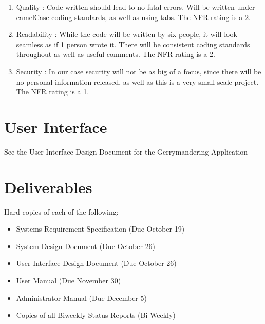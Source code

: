 \documentclass{article}
\begin{document}
\begin{addmargin}[2em]{0em}
\begin{enumerate}
\item Quality : Code written should lead to no fatal errors. Will be written under camelCase coding standards, as well as using tabs. The NFR rating is a 2.

\item Readability : While the code will be written by six people, it will look seamless as if 1 person wrote it. There will be consistent coding standards throughout as well as useful comments. The NFR rating is a 2.

\item Security : In our case security will not be as big of a focus, since there will be no personal information released, as well as this is a very small scale project. The NFR rating is a 1.

\end{enumerate}
\end{addmargin}


\section{User Interface}\label{sec:ui}
\vspace{2.5mm}

See the User Interface Design Document for the Gerrymandering Application

\vspace{2.5mm}
\section{Deliverables}\label{sec:deliverables}

Hard copies of each of the following:

\vspace{2.5mm}

\begin{adjustwidth}{2em}{0pt}
\begin{itemize}

\item Systems Requirement Specification (Due October 19)
\item System Design Document (Due October 26)
\item User Interface Design Document (Due October 26)
\item User Manual (Due November 30)
\item Administrator Manual (Due December 5)
\item Copies of all Biweekly Status Reports (Bi-Weekly)

\end{itemize}
\end{adjustwidth}
\end{document}
